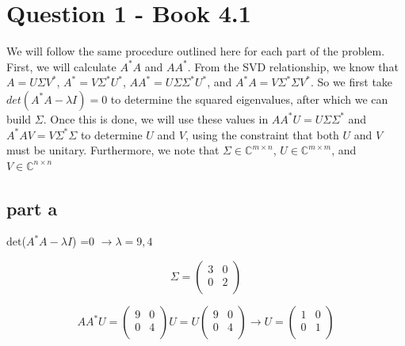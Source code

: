 \documentclass[a4paper,12pt]{article}
\begin{document}
\section{Question 1 - Book 4.1}
We will follow the same procedure outlined here for each part of the problem. First, we will calculate $A^*A$ and $AA^*$. From the SVD relationship, we know that $A=U\Sigma V^*$, $A^* =V\Sigma^*U^*$, $AA^* =U\Sigma \Sigma^* U^*$, and $A^*A= V\Sigma^* \Sigma V^*$. So we first take $det(A^*A -\lambda I) =0$ to determine the squared eigenvalues, after which we can build $\Sigma$. Once this is done, we will use these values in $AA^* U=U\Sigma \Sigma^*$ and $A^*A V=V\Sigma^* \Sigma$ to determine $U$ and $V$, using the constraint that both $U$ and $V$ must be unitary. Furthermore, we note that $\Sigma \in \mathbb{C}^{m\times n}$, $U\in \mathbb{C}^{m\times m}$, and $V\in \mathbb{C}^{n\times n}$


\subsection{part a}
det($A^*A - \lambda I$) =0 $\rightarrow \lambda=9,4$

\begin{equation}
\Sigma =\begin{pmatrix}
3&0	\\
0&2\\ 
\end{pmatrix}
\end{equation}



\begin{equation}
AA^*U=\begin{pmatrix}
9&0	\\
0&4\\ 
\end{pmatrix}  U = U\begin{pmatrix}
9&0	\\
0&4\\ 
\end{pmatrix} \rightarrow U=\begin{pmatrix}
1&0	\\
0&1\\ 
\end{pmatrix}
\end{equation}
\end{document}
